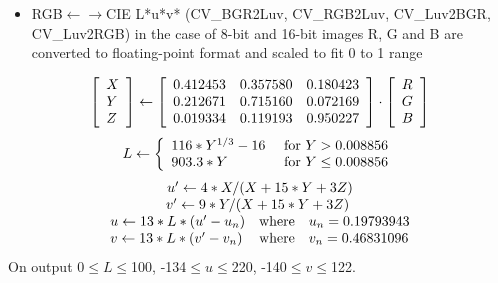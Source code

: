 \documentclass{article}
\begin{document}
\begin{itemize}
\item RGB$\leftarrow \to $CIE L*u*v* (CV{\_}BGR2Luv, CV{\_}RGB2Luv, CV{\_}Luv2BGR, CV{\_}Luv2RGB) in the case of 8-bit and 16-bit images R, G and B are converted to floating-point format and scaled to fit 0 to 1 range
\end{itemize}
\[
\left[ {{\begin{array}{*{20}c}
 X \hfill \\
 Y \hfill \\
 Z \hfill \\
\end{array} }} \right]\leftarrow \left[ {{\begin{array}{*{20}c}
 {0.412453} \hfill & {0.357580} \hfill & {0.180423} \hfill \\
 {0.212671} \hfill & {0.715160} \hfill & {0.072169} \hfill \\
 {0.019334} \hfill & {0.119193} \hfill & {0.950227} \hfill \\
\end{array} }} \right]\cdot \left[ {{\begin{array}{*{20}c}
 R \hfill \\
 G \hfill \\
 B \hfill \\
\end{array} }} \right]
\]
\[
L\leftarrow \left\{ {{\begin{array}{*{20}c}
 {116\ast Y^{1/3}-16} \hfill & {\mbox{ for }Y>0.008856} \hfill \\
 {903.3\ast Y} \hfill & {\mbox{ for }Y\le 0.008856} \hfill \\
\end{array} }} \right.
\]
\[
\begin{array}{c}
 {u}'\leftarrow 4\ast X/(X+15\ast Y+3Z) \\
 {v}'\leftarrow 9\ast Y/(X+15\ast Y+3Z)\mbox{ } \\
 {\begin{array}{*{20}c}
 {u\leftarrow 13\ast L\ast ({u}'-u_n )} \hfill & {\mbox{where}} \hfill &
{u_n =0.19793943} \hfill \\
 {v\leftarrow 13\ast L\ast ({v}'-v_n )} \hfill & {\mbox{where}} \hfill &
{v_n =0.46831096} \hfill \\
\end{array} } \\
 \end{array}
\]
On output 0$\le L\le $100, -134$\le u\le $220, -140$\le v \le $122.
\end{document}
